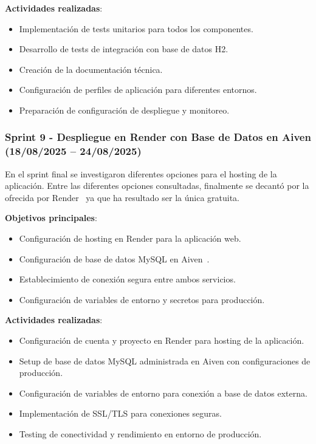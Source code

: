 \textbf{Actividades realizadas}:
\begin{itemize}
\tightlist
\item
Implementación de tests unitarios para todos los componentes.
\item
Desarrollo de tests de integración con base de datos H2.
\item
Creación de la documentación técnica.
\item
Configuración de perfiles de aplicación para diferentes entornos.
\item
Preparación de configuración de despliegue y monitoreo.
\end{itemize}

\newpage

\subsubsection{Sprint 9 - Despliegue en Render con Base de Datos en Aiven (18/08/2025 – 24/08/2025)} 
En el sprint final se investigaron diferentes opciones para el hosting de la aplicación. Entre las diferentes opciones consultadas, finalmente se decantó por la ofrecida por Render~\cite{render} ya que ha resultado ser la única gratuita.

\textbf{Objetivos principales}:
\begin{itemize}
\tightlist
\item
Configuración de hosting en Render para la aplicación web.
\item
Configuración de base de datos MySQL en Aiven~\cite{aiven}.
\item
Establecimiento de conexión segura entre ambos servicios.
\item
Configuración de variables de entorno y secretos para producción.
\end{itemize}

\textbf{Actividades realizadas}:
\begin{itemize}
\tightlist
\item
Configuración de cuenta y proyecto en Render para hosting de la aplicación.
\item
Setup de base de datos MySQL administrada en Aiven con configuraciones de producción.
\item
Configuración de variables de entorno para conexión a base de datos externa.
\item
Implementación de SSL/TLS para conexiones seguras.
\item
Testing de conectividad y rendimiento en entorno de producción.
\end{itemize}

